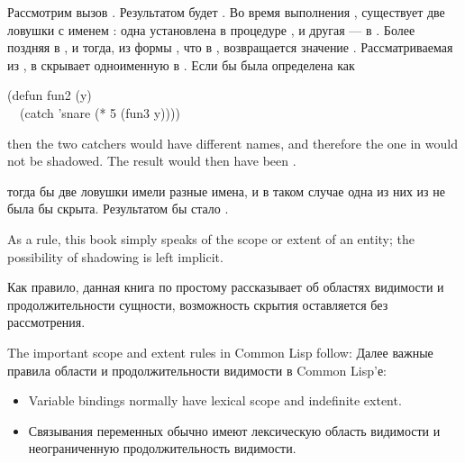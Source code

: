 Рассмотрим вызов . Результатом будет . Во время выполнения
, существует две ловушки с именем : одна установлена в
процедуре , и другая --- в . Более поздняя в , и
тогда, из формы , что в , возвращается значение .
Рассматриваемая из ,  в  скрывает одноименную в
.
Если бы  была определена как
\begin{lisp}
(defun fun2 (y) \\
~~(catch 'snare (* 5 (fun3 y))))
\end{lisp}
then the two catchers would have different names, and therefore the one
in  would not be shadowed.  The result would then have been .

тогда бы две ловушки имели разные имена, и в таком случае одна из них из
 не была бы скрыта. Результатом бы стало .

As a rule, this book simply speaks of the scope or extent of an entity;
the possibility of shadowing is left implicit.

Как правило, данная книга по простому рассказывает об областях видимости и
продолжительности сущности, возможность скрытия оставляется без рассмотрения.

The important scope and extent rules in Common Lisp follow:
Далее важные правила области и продолжительности видимости в Common Lisp'е:
\begin{itemize}
\item
Variable bindings normally have lexical scope and indefinite extent.

\item
Связывания переменных обычно имеют лексическую область видимости и неограниченную
продолжительность видимости.
\end{itemize}

